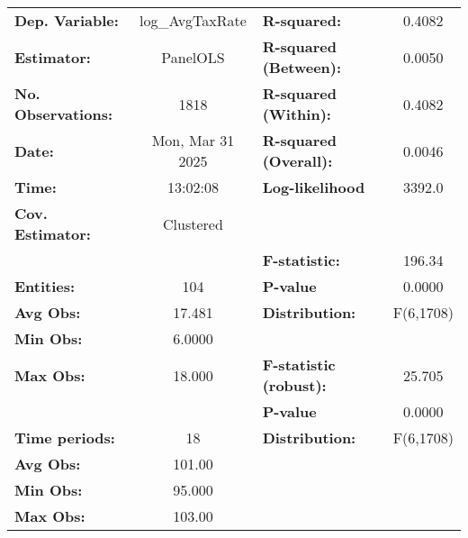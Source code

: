 \begin{center}
\begin{tabular}{lclc}
\toprule
\textbf{Dep. Variable:}              &  log\_AvgTaxRate   & \textbf{  R-squared:         }   &      0.4082      \\
\textbf{Estimator:}                  &      PanelOLS      & \textbf{  R-squared (Between):}  &      0.0050      \\
\textbf{No. Observations:}           &        1818        & \textbf{  R-squared (Within):}   &      0.4082      \\
\textbf{Date:}                       &  Mon, Mar 31 2025  & \textbf{  R-squared (Overall):}  &      0.0046      \\
\textbf{Time:}                       &      13:02:08      & \textbf{  Log-likelihood     }   &      3392.0      \\
\textbf{Cov. Estimator:}             &     Clustered      & \textbf{                     }   &                  \\
\textbf{}                            &                    & \textbf{  F-statistic:       }   &      196.34      \\
\textbf{Entities:}                   &        104         & \textbf{  P-value            }   &      0.0000      \\
\textbf{Avg Obs:}                    &       17.481       & \textbf{  Distribution:      }   &    F(6,1708)     \\
\textbf{Min Obs:}                    &       6.0000       & \textbf{                     }   &                  \\
\textbf{Max Obs:}                    &       18.000       & \textbf{  F-statistic (robust):} &      25.705      \\
\textbf{}                            &                    & \textbf{  P-value            }   &      0.0000      \\
\textbf{Time periods:}               &         18         & \textbf{  Distribution:      }   &    F(6,1708)     \\
\textbf{Avg Obs:}                    &       101.00       & \textbf{                     }   &                  \\
\textbf{Min Obs:}                    &       95.000       & \textbf{                     }   &                  \\
\textbf{Max Obs:}                    &       103.00       & \textbf{                     }   &                  \\

\end{tabular}
\end{center}
